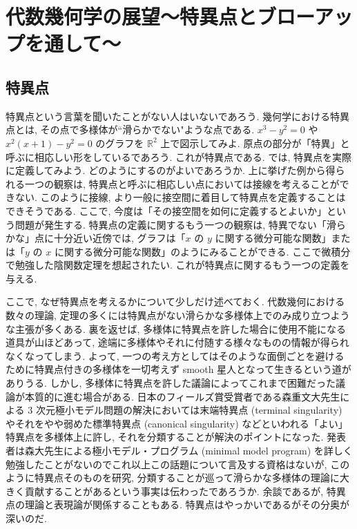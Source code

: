 \documentclass[openany, a4paper, oneside]{jsbook}
\begin{document}
\section{代数幾何学の展望〜特異点とブローアップを通して〜}

\subsection{特異点}

特異点という言葉を聞いたことがない人はいないであろう.
幾何学における特異点とは, その点で多様体が``滑らかでない"ような点である.
$x^3-y^2=0$ や $x^2 (x+1)-y^2=0$ のグラフを $\mathbb{R}^2$ 上で図示してみよ.
原点の部分が「特異」と呼ぶに相応しい形をしているであろう.
これが特異点である.
では, 特異点を実際に定義してみよう.
どのようにするのがよいであろうか.
上に挙げた例から得られる一つの観察は, 特異点と呼ぶに相応しい点においては接線を考えることができない.
このように接線, より一般に接空間に着目して特異点を定義することはできそうである.
ここで, 今度は「その接空間を如何に定義するとよいか」という問題が発生する.
特異点の定義に関するもう一つの観察は, 特異でない「滑らかな」点に十分近い近傍では,
グラフは「$x$ の $y$ に関する微分可能な関数」または「$y$ の $x$ に関する微分可能な関数」のようにみることができる.
ここで微積分で勉強した陰関数定理を想起されたい.
これが特異点に関するもう一つの定義を与える.

ここで, なぜ特異点を考えるかについて少しだけ述べておく.
代数幾何における数々の理論, 定理の多くには特異点がない滑らかな多様体上でのみ成り立つような主張が多くある.
裏を返せば, 多様体に特異点を許した場合に使用不能になる道具が山ほどあって,
途端に多様体やそれに付随する様々なものの情報が得られなくなってしまう.
よって, 一つの考え方としてはそのような面倒ごとを避けるために特異点付きの多様体を一切考えず smooth 星人となって生きるという道がありうる.
しかし, 多様体に特異点を許した議論によってこれまで困難だった議論が本質的に進む場合がある.
日本のフィールズ賞受賞者である森重文大先生による 3 次元極小モデル問題の解決においては末端特異点 (terminal singularity)
やそれをやや弱めた標準特異点 (canonical singularity) などといわれる「よい」特異点を多様体上に許し,
それを分類することが解決のポイントになった.
発表者は森大先生による極小モデル・プログラム (minimal model program) を詳しく勉強したことがないのでこれ以上この話題について言及する資格はないが,
このように特異点そのものを研究, 分類することが巡って滑らかな多様体の理論に大きく貢献することがあるという事実は伝わったであろうか.
余談であるが, 特異点の理論と表現論が関係することもある.
特異点はやっかいであるがその分奥が深いのだ.
\end{document}
